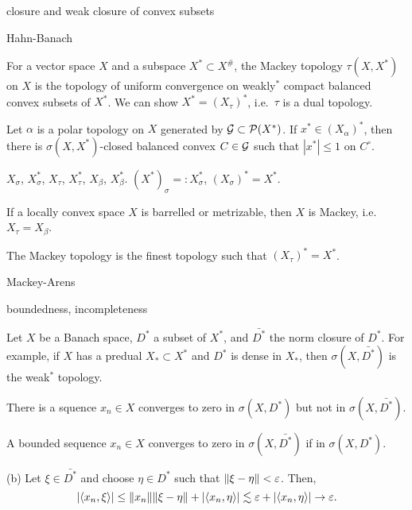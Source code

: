 \documentclass{../../large}
\begin{document}
\begin{prb}
closure and weak closure of convex subsets
\end{prb}
\begin{pf}
Hahn-Banach
\end{pf}

\begin{prb}
For a vector space $X$ and a subspace $X^*\subset X^\#$, the Mackey topology $\tau(X,X^*)$ on $X$ is the topology of uniform convergence on weakly$^*$ compact balanced convex subsets of $X^*$.
We can show $X^*=(X_\tau)^*$, i.e.~$\tau$ is a dual topology.

Let $\alpha$ is a polar topology on $X$ generated by $\mathcal{G}\subset\mathcal{P}(X^*)$.
If $x^*\in(X_\alpha)^*$, then there is $\sigma(X,X^*)$-closed balanced convex $C\in\mathcal{G}$ such that $|x^*|\le1$ on $C^\circ$.

$X_\sigma$, $X^*_\sigma$, $X_\tau$, $X^*_\tau$, $X_\beta$, $X^*_\beta$.
$(X^*)_\sigma=:X^*_\sigma$, $(X_\sigma)^*=X^*$.

\begin{parts}
\item If a locally convex space $X$ is barrelled or metrizable, then $X$ is Mackey, i.e.~$X_\tau=X_\beta$.
\item The Mackey topology is the finest topology such that $(X_\tau)^*=X^*$.
\end{parts}
\end{prb}

Mackey-Arens

boundedness, incompleteness


\begin{prb}

\end{prb}

\begin{prb}
Let $X$ be a Banach space, $D^*$ a subset of $X^*$, and $\bar{D^*}$ the norm closure of $D^*$.
For example, if $X$ has a predual $X_*\subset X^*$ and $D^*$ is dense in $X_*$, then $\sigma(X,\bar{D^*})$ is the weak$^*$ topology.
\begin{parts}
\item There is a squence $x_n\in X$ converges to zero in $\sigma(X,D^*)$ but not in $\sigma(X,\bar{D^*})$.
\item A bounded sequence $x_n\in X$ converges to zero in $\sigma(X,\bar{D^*})$ if in $\sigma(X,D^*)$.
\end{parts}
\end{prb}
\begin{pf}
(b)
Let $\xi\in\bar{D^*}$ and choose $\eta\in D^*$ such that $\|\xi-\eta\|<\varepsilon$.
Then,
\[|\langle x_n,\xi\rangle|\le\|x_n\|\|\xi-\eta\|+|\langle x_n,\eta\rangle|\lesssim\varepsilon+|\langle x_n,\eta\rangle|\to\varepsilon.\]
\end{pf}
\end{document}
